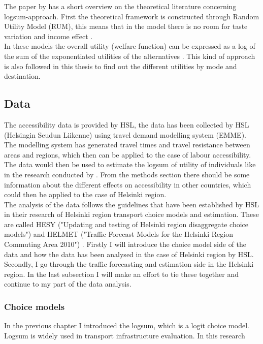The paper by \citep{logsum} has a short overview on the theoretical  literature concerning logsum-approach. First the theoretical framework is constructed through Random Utility Model (RUM), this means that in the model there is no room for taste variation and income effect \citep{logsum}. \\

In these models the overall utility (welfare function) can be expressed as a log of the sum of the exponentiated utilities of the alternatives \citep{logsum}. This kind of approach is also followed in this thesis to find out the different utilities by mode and destination. 

\subsection{Data}
	
The accessibility data is provided by HSL, the data has been collected by HSL (Helsingin Seudun Liikenne) using travel demand modelling system (EMME). The modelling system has generated travel times and travel resistance between areas and regions, which then can be applied to the case of labour accessibility. The data would then be used to estimate the logsum of utility of individuals like in the research conducted by \cite[p.~387]{geurs}. From the methods section there should be some information about the different effects on accessibility in other countries, which could then be applied to the case of Helsinki region.\\

The analysis of the data follows the guidelines that have been established by HSL in their research of Helsinki region transport choice models and estimation. These are called HESY ("Updating and testing of Helsinki region disaggregate choice models") \citep{hesy} and HELMET ("Traffic Forecast Models for the Helsinki Region Commuting Area 2010") \citep{helmet}. Firstly I will introduce the choice model side of the data and how the data has been analysed in the case of Helsinki region by HSL. Secondly, I go through the traffic forecasting and estimation side in the Helsinki region. In the last subsection I will make an effort to tie these together and continue to my part of the data analysis.  \\

\subsubsection{Choice models}

In the previous chapter I introduced the logsum, which is a logit choice model. Logsum is widely used in transport infrastructure evaluation. In this research \citep{hesy}